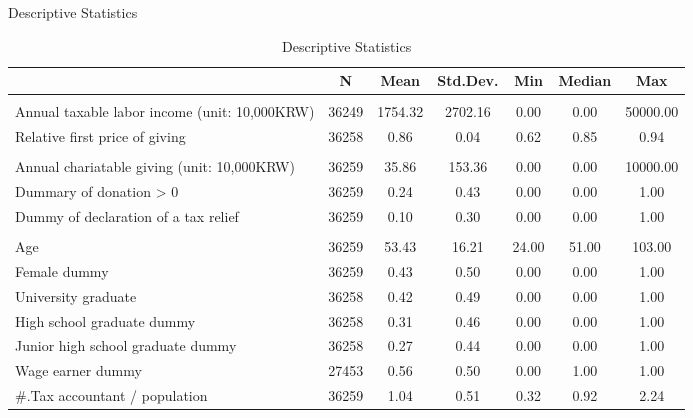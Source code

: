 \documentclass[
  ignorenonframetext,
  aspectratio=169,
]{beamer}
\begin{document}
\begin{frame}{Descriptive Statistics}
\protect\hypertarget{descriptive-statistics}{}
\begin{table}

\caption{\label{tab:SummaryCovariate}Descriptive Statistics}
\centering
\fontsize{6}{8}\selectfont
\begin{tabular}[t]{lcccccc}
\toprule
  & N & Mean & Std.Dev. & Min & Median & Max\\
\midrule
\addlinespace[0.3em]
\multicolumn{7}{l}{\textbf{Income and giving price}}\\
\hspace{1em}Annual taxable labor income (unit: 10,000KRW) & 36249 & 1754.32 & 2702.16 & 0.00 & 0.00 & 50000.00\\
\hspace{1em}Relative first price of giving & 36258 & 0.86 & 0.04 & 0.62 & 0.85 & 0.94\\
\addlinespace[0.3em]
\multicolumn{7}{l}{\textbf{Charitable giving}}\\
\hspace{1em}Annual chariatable giving (unit: 10,000KRW) & 36259 & 35.86 & 153.36 & 0.00 & 0.00 & 10000.00\\
\hspace{1em}Dummary of donation > 0 & 36259 & 0.24 & 0.43 & 0.00 & 0.00 & 1.00\\
\hspace{1em}Dummy of declaration of a tax relief & 36259 & 0.10 & 0.30 & 0.00 & 0.00 & 1.00\\
\addlinespace[0.3em]
\multicolumn{7}{l}{\textbf{Individual Characteristics}}\\
\hspace{1em}Age & 36259 & 53.43 & 16.21 & 24.00 & 51.00 & 103.00\\
\hspace{1em}Female dummy & 36259 & 0.43 & 0.50 & 0.00 & 0.00 & 1.00\\
\hspace{1em}University graduate & 36258 & 0.42 & 0.49 & 0.00 & 0.00 & 1.00\\
\hspace{1em}High school graduate dummy & 36258 & 0.31 & 0.46 & 0.00 & 0.00 & 1.00\\
\hspace{1em}Junior high school graduate dummy & 36258 & 0.27 & 0.44 & 0.00 & 0.00 & 1.00\\
\hspace{1em}Wage earner dummy & 27453 & 0.56 & 0.50 & 0.00 & 1.00 & 1.00\\
\hspace{1em}\#.Tax accountant / population & 36259 & 1.04 & 0.51 & 0.32 & 0.92 & 2.24\\
\bottomrule
\end{tabular}
\end{table}
\end{frame}
\end{document}
